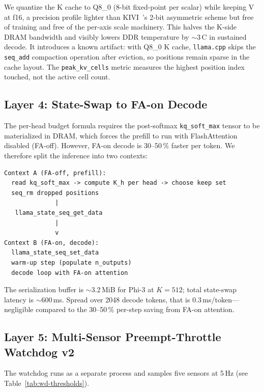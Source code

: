 \documentclass[sigconf, anonymous=false, screen=true]{acmart}
\begin{document}
We quantize the K cache to Q8\_0 (8-bit fixed-point per scalar) while keeping V at f16, a precision profile lighter than KIVI~\cite{liu2024kivi}'s 2-bit asymmetric scheme but free of training and free of the per-axis scale machinery. This halves the K-side DRAM bandwidth and visibly lowers DDR temperature by $\sim$3\,\textdegree C in sustained decode. It introduces a known artifact: with Q8\_0 K cache, \texttt{llama.cpp} skips the \texttt{seq\_add} compaction operation after eviction, so positions remain sparse in the cache layout. The \texttt{peak\_kv\_cells} metric measures the highest position index touched, not the active cell count.

\subsection{Layer 4: State-Swap to FA-on Decode}

The per-head budget formula requires the post-softmax \texttt{kq\_soft\_max} tensor to be materialized in DRAM, which forces the prefill to run with FlashAttention disabled (FA-off). However, FA-on decode is 30--50\,\% faster per token. We therefore split the inference into two contexts:

\begin{lstlisting}[basicstyle=\ttfamily\footnotesize]
Context A (FA-off, prefill):
  read kq_soft_max -> compute K_h per head -> choose keep set
  seq_rm dropped positions
              |
   llama_state_seq_get_data
              |
              v
Context B (FA-on, decode):
  llama_state_seq_set_data
  warm-up step (populate n_outputs)
  decode loop with FA-on attention
\end{lstlisting}

The serialization buffer is $\sim$3.2\,MiB for Phi-3 at $K{=}512$; total state-swap latency is $\sim$600\,ms. Spread over 2048 decode tokens, that is 0.3\,ms/token---negligible compared to the 30--50\,\% per-step saving from FA-on attention.

\subsection{Layer 5: Multi-Sensor Preempt-Throttle Watchdog v2}
\label{sec:watchdog}

The watchdog runs as a separate process and samples five sensors at 5\,Hz (see Table~\ref{tab:wd-thresholds}).
\end{document}
